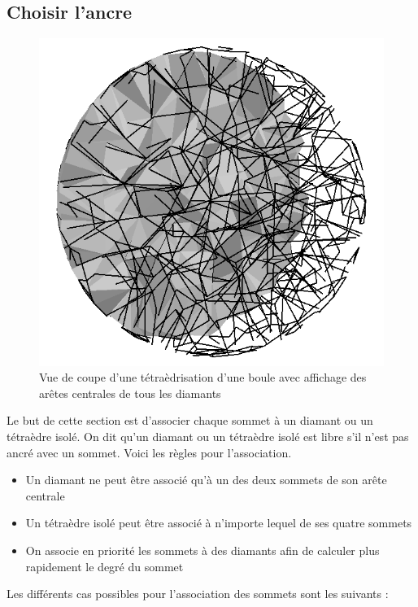 \subsection{Choisir l'ancre}
\label{ancrage}
\noindent
\begin{figure}[H]
\begin{center}
\includegraphics[scale=0.2]{Images/central_edges}
\caption{Vue de coupe d'une tétraèdrisation d'une boule avec affichage des arêtes centrales de tous les diamants}
\label{fig:central_edges}
\end{center}
\end{figure}
\noindent
Le but de cette section est d'associer chaque sommet à un diamant ou un tétraèdre isolé. On dit qu'un diamant ou un tétraèdre isolé est libre s'il n'est pas ancré avec un sommet. Voici les règles pour l'association.\\
\begin{itemize}
\item Un diamant ne peut être associé qu'à un des deux sommets de son arête centrale
\item Un tétraèdre isolé peut être associé à n'importe lequel de ses quatre sommets
\item On associe en priorité les sommets à des diamants afin de calculer plus rapidement le degré du sommet\\
\end{itemize}
Les différents cas possibles pour l'association des sommets sont les suivants :\\
